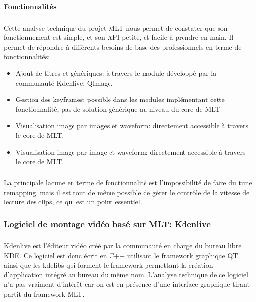 \newpage\paragraph{Fonctionnalités}

\subparagraph{ }

Cette analyse technique du projet MLT nous permet de constater
que son fonctionnement est simple, et son API petite, et facile à
prendre en main.  Il permet de répondre à différents besoins de base
des professionnels en terme de fonctionnalités:

\begin{itemize}

  \item {Ajout de titres et génériques: à travers le module développé
  par la communauté Kdenlive: QImage.}

  \item {Gestion des keyframes: possible dans les modules implémentant
    cette fonctionnalité, pas de solution générique au niveau du core
    de MLT}

  \item {Visualisation image par images et waveform: directement
  accessible à travers le core de MLT.}

  \item {Visualisation image par image et waveform: directement accessible
  à travers le core de MLT.}

\end{itemize}

\subparagraph{}

La principale lacune en terme de fonctionnalité est l'impossibilité de
faire du time remapping, mais il est tout de même possible de gérer
le contrôle de la vitesse de lecture des clips, ce qui est un point
essentiel.

\subsubsection {Logiciel de montage vidéo basé sur MLT:
Kdenlive}

\subparagraph{}

Kdenlive est l'éditeur vidéo créé par la communauté en charge
du bureau libre KDE. Ce logiciel est donc écrit en C++ utilisant le
framework graphique QT  ainsi que les kdelibs qui forment le framework
permettant la création d'application intégré au bureau du même nom.
L'analyse technique de ce logiciel n'a pas vraiment d'intérêt car on
est en présence d'une interface graphique tirant partit du framework
MLT.

